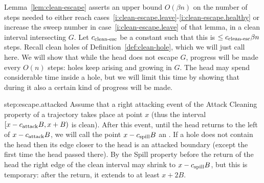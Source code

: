 \documentclass[12pt]{memoir}
\renewcommand{\le}{\leq}
\def\B{B}
\newcommand{\Q}{Q}
\newcommand{\cns}[1]{c_{\textrm{\upshape #1}}}
\newcommand{\CAtt}{\cns{attack}}
\newcommand{\CCleanEsc}{\cns{clean-esc}}
\newcommand{\CSpill}{\cns{spill}}
\begin{document}
\begin{Proof}
Lemma~\ref{lem:clean-escape} asserts an upper bound \( O(\beta n) \) on the 
number of steps needed to either reach cases~\eqref{i:clean-escape.leave}-\eqref{i:clean-escape.healthy} or
increase the sweep number in case~\eqref{i:clean-escape.leave} of that lemma, in a clean 
interval intersecting \( G \).
Let \( \CCleanEsc \) be a constant such that this is \( \le \CCleanEsc\beta n \) steps.
Recall clean holes of Definition~\ref{def:clean-hole}, which we will just call  here.
We will show that while the head does not escape \( G \), progress will be made every \( O(n) \) steps:
holes keep arising and growing in \( G \).
The head may spend considerable time inside a hole, but we will limit this time by
showing that during it also a certain kind of progress will be made.


\begin{step+}{step:escape.attacked}
Assume that a right attacking event of the Attack Cleaning property
of a trajectory takes place at point \( x \) (thus the interval
\( \lint{x-\CAtt\B}{x+\B} \) is clean).
After this event, until the head returns to the left of \( x-\CAtt \B \),
we will call the point \( x-\CSpill \B \) an .
If a hole does not contain the head
then its edge closer to the head is an attacked boundary (except the first time the head passed there).
By the Spill property
before the return of the head the right edge of the clean interval may shrink to
\( x-\CSpill \B \), but this is temporary: after the return, it extends to at least \( x+2\B \).
\end{step+}


\end{Proof}
\end{document}
